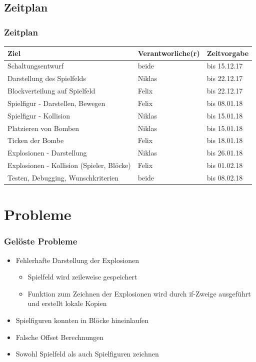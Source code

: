 \documentclass[18pt]{beamer}
\begin{document}
	\subsection{Zeitplan}
		\begin{frame}
			\frametitle{Zeitplan}
			\begin{table}[H]
				\centering
				\label{my-label}
				\begin{tabular}{l|l|l}
					Ziel                                      & Verantworliche(r) & Zeitvorgabe  \\
					\hline
					Schaltungsentwurf                         & beide           & bis 15.12.17 \\
					Darstellung des Spielfelds                & Niklas          & bis 22.12.17 \\
					Blockverteilung auf Spielfeld             & Felix           & bis 22.12.17 \\
					Spielfigur - Darstellen, Bewegen          & Felix           & bis 08.01.18 \\
					Spielfigur - Kollision                    & Niklas          & bis 15.01.18 \\
					Platzieren von Bomben                     & Niklas          & bis 15.01.18 \\
					Ticken der Bombe                          & Felix           & bis 18.01.18 \\
					Explosionen - Darstellung                 & Niklas          & bis 26.01.18 \\
					Explosionen - Kollision (Spieler, Blöcke) & Felix           & bis 01.02.18 \\
					Testen, Debugging, Wunschkriterien        & beide           & bis 08.02.18
				\end{tabular}
			\end{table}
		\end{frame}
	
\section{Probleme}
	\begin{frame}
		\frametitle{Gelöste Probleme}
		\begin{itemize}
			\item Fehlerhafte Darstellung der Explosionen
			\begin{itemize}
				\item Spielfeld wird zeileweise gespeichert
				\item Funktion zum Zeichnen der Explosionen wird durch if-Zweige ausgeführt und erstellt lokale Kopien
			\end{itemize}
			\item Spielfiguren konnten in Blöcke hineinlaufen
			\item Falsche Offset Berechnungen
			\item Sowohl Spielfeld als auch Spielfiguren zeichnen
		\end{itemize}
	\end{frame}
\end{document}
